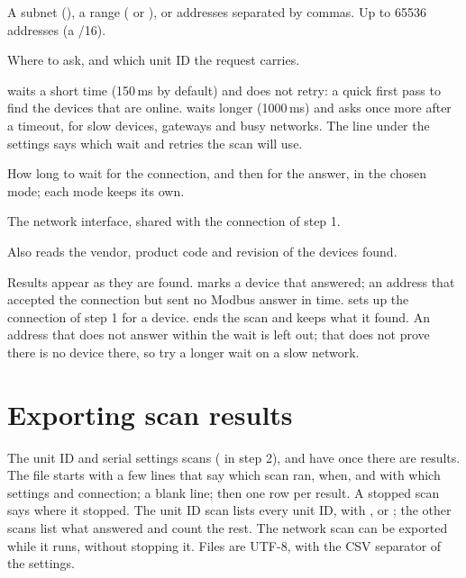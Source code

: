 \begin{description}[style=nextline, leftmargin=0pt, font=\intermedium]
  \item[Addresses] A subnet (), a range
    ( or ), or addresses
    separated by commas. Up to 65536 addresses (a /16).
  \item[Port, Unit ID] Where to ask, and which unit ID the request carries.
  \item[Mode]  waits a short time (150\,ms by default) and does not
    retry: a quick first pass to find the devices that are online.
     waits longer (1000\,ms) and asks once more after a timeout,
    for slow devices, gateways and busy networks. The line under the settings
    says which wait and retries the scan will use.
  \item[Wait (ms)] How long to wait for the connection, and then for the
    answer, in the chosen mode; each mode keeps its own.
  \item[Send from] The network interface, shared with the connection of
    step 1.
  \item[Identify (FC43)] Also reads the vendor, product code and revision of
    the devices found.
\end{description}

Results appear as they are found.  marks a device that answered;
 an address that accepted the connection but sent no Modbus
answer in time.  sets up the connection of step 1 for a device.
 ends the scan and keeps what it found. An address that does not
answer within the wait is left out; that does not prove there is no device
there, so try a longer wait on a slow network.

\section{Exporting scan results}

The unit ID and serial settings scans ( in step 2),
 and  have  once there
are results. The file starts with a few lines that say which scan ran, when,
and with which settings and connection; a blank line; then one row per
result. A stopped scan says where it stopped. The unit ID scan lists every unit
ID, with ,  or ; the other scans
list what answered and count the rest. The network scan can be exported while
it runs, without stopping it. Files are UTF-8, with the CSV separator of the
settings.

